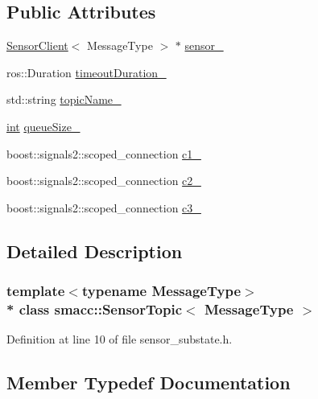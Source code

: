 \subsection*{Public Attributes}
\begin{DoxyCompactItemize}
\item 
\hyperlink{classsmacc_1_1SensorClient}{Sensor\+Client}$<$ Message\+Type $>$ $\ast$ \hyperlink{classsmacc_1_1SensorTopic_a0f51a83e96f6b735033a8474ef1c4191}{sensor\+\_\+}
\item 
ros\+::\+Duration \hyperlink{classsmacc_1_1SensorTopic_a026137c1c2cf7212c9b845e7c33c9b3e}{timeout\+Duration\+\_\+}
\item 
std\+::string \hyperlink{classsmacc_1_1SensorTopic_a555d2331f17700b087b3bf518a5367e1}{topic\+Name\+\_\+}
\item 
\hyperlink{classint}{int} \hyperlink{classsmacc_1_1SensorTopic_a8f9f1d8ca6c9c6430e1ee1ba78022483}{queue\+Size\+\_\+}
\item 
boost\+::signals2\+::scoped\+\_\+connection \hyperlink{classsmacc_1_1SensorTopic_a3c27b66b1bd8bc850875d95ad5a41041}{c1\+\_\+}
\item 
boost\+::signals2\+::scoped\+\_\+connection \hyperlink{classsmacc_1_1SensorTopic_a7d93fd46086bf098cf75a12c27976a8e}{c2\+\_\+}
\item 
boost\+::signals2\+::scoped\+\_\+connection \hyperlink{classsmacc_1_1SensorTopic_a2e54533c2a0e0daec10eec3f69ff63d6}{c3\+\_\+}
\end{DoxyCompactItemize}


\subsection{Detailed Description}
\subsubsection*{template$<$typename Message\+Type$>$\\*
class smacc\+::\+Sensor\+Topic$<$ Message\+Type $>$}



Definition at line 10 of file sensor\+\_\+substate.\+h.



\subsection{Member Typedef Documentation}
